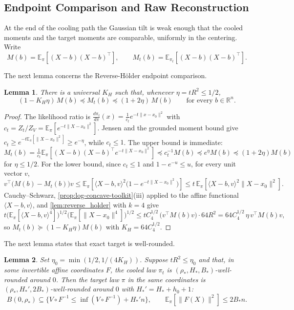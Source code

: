 \documentclass[11pt]{article}
\numberwithin{equation}{section}
\newtheorem{lemma}{Lemma}[section]
\theoremstyle{definition}
\newcommand{\R}{\mathbb{R}}
\newcommand{\E}[2]{\mathbb{E}_{#1}\left[#2\right]}
\begin{document}
\subsection{Endpoint Comparison and Raw Reconstruction}
\label{sec:endpoint-reconstruction}

At the end of the cooling path the Gaussian tilt is weak enough that the cooled
moments and the target moments are comparable, uniformly in the centering.
Write
\[
M(b)=\E{\pi}{(X-b)(X-b)^\top},
\qquad
M_t(b)=\E{\pi_t}{(X-b)(X-b)^\top}.
\]

The next lemma concerns the Reverse-H\"older endpoint comparison.

\begin{lemma}
\label{lem:endpoint}
There is a universal $K_H$ such that, whenever
$\eta=tR^2\leq1/2$,
\[
(1-K_H\eta)\,M(b)
\preceq M_t(b)
\preceq(1+2\eta)\,M(b)
\qquad
\text{for every }b\in\R^n .
\]
\end{lemma}

\begin{proof}
The likelihood ratio is $\frac{d\pi_t}{d\pi}(x)=\frac{1}{c_t}e^{-t\|x-x_0\|^2}$
with
$c_t=Z_t/Z_V=\E{\pi}{e^{-t\|X-x_0\|^2}}$.
Jensen and the grounded moment bound give
$c_t\geq e^{-t\E{\pi}{\|X-x_0\|^2}}\geq e^{-\eta}$, while
$c_t\leq1$.
The upper bound is immediate:
$M_t(b)=\frac1{c_t}\E{\pi}{(X-b)(X-b)^\top e^{-t\|X-x_0\|^2}} \preceq c_t^{-1}M(b)\preceq e^{\eta}M(b)\preceq(1+2\eta)M(b)$
for
$\eta\leq1/2$.
For the lower bound, since $c_t\leq1$ and
$1-e^{-u}\leq u$, for every unit vector
$v$,
\[
v^\top\bigl(M(b)-M_t(b)\bigr)v
\leq\E{\pi}{\langle X-b,v\rangle^2 \bigl(1-e^{-t\|X-x_0\|^2}\bigr)}
\leq t\,\E{\pi}{\langle X-b,v\rangle^2\|X-x_0\|^2}.
\]
Cauchy--Schwarz, \cref{prop:log-concave-toolkit}(iii) applied to the affine
functional $\langle X-b,v\rangle$, and \cref{lem:reverse_holder} with
$k=4$ give
\[
t\bigl(\E{\pi}{\langle X-b,v\rangle^4}\bigr)^{1/2} \bigl(\E{\pi}{\|X-x_0\|^4}\bigr)^{1/2}
\leq tC_4^{1/2}\,\bigl(v^\top M(b)v\bigr)\cdot64R^2
=64C_4^{1/2}\,\eta\,v^\top M(b)v ,
\]
so $M_t(b)\succeq(1-K_H\eta)M(b)$ with
$K_H=64C_4^{1/2}$.
\end{proof}

The next lemma states that exact target is well-rounded.

\begin{lemma}
\label{lem:exact-wr}
Set $\eta_0=\min(1/2,1/(4K_H))$.
Suppose $tR^2\leq\eta_0$ and that, in some invertible affine coordinates
$F$, the cooled law
$\pi_t$ is
$(\rho_*,H_*,B_*)$-well-rounded around
$0$.
Then the target law $\pi$ in the same coordinates is
$(\rho_*,H_*',2B_*)$-well-rounded around
$0$ with
$H_*'=H_*+h_0+1$:
\[
 B(0,\rho_*)\subseteq\{V\circ F^{-1}\leq\inf(V\circ F^{-1})+H_*'n\},
 \qquad
 \E{\pi}{\|F(X)\|^2}\leq2B_*n .
\]
\end{lemma}
\end{document}
